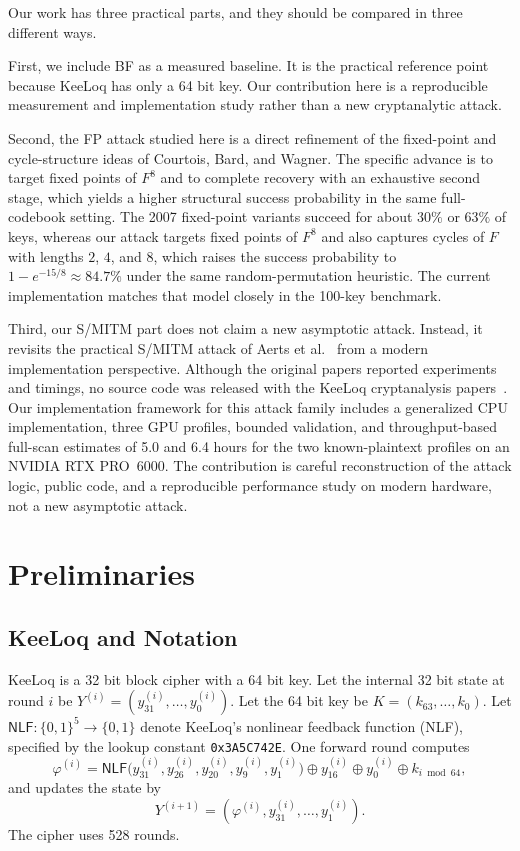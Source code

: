 \documentclass[version=preprint]{iacrcc}
\providecommand{\NLF}{\mathsf{NLF}}
\begin{document}
Our work has three practical parts, and they should be compared in three different ways.

First, we include BF as a measured baseline.
It is the practical reference point because KeeLoq has only a 64 bit key.
Our contribution here is a reproducible measurement and implementation study rather than a new cryptanalytic attack.

Second, the FP attack studied here is a direct refinement of the fixed-point and cycle-structure ideas of Courtois, Bard, and Wagner.
The specific advance is to target fixed points of $F^8$ and to complete recovery with an exhaustive second stage, which yields a higher structural success probability in the same full-codebook setting.
The 2007 fixed-point variants succeed for about $30\%$ or $63\%$ of keys, whereas our attack targets fixed points of $F^8$ and also captures cycles of $F$ with lengths $2$, $4$, and $8$, which raises the success probability to $1 - e^{-15/8} \approx 84.7\%$ under the same random-permutation heuristic.
The current implementation matches that model closely in the 100-key benchmark.

Third, our S/MITM part does not claim a new asymptotic attack.
Instead, it revisits the practical S/MITM attack of Aerts et al.~\cite{indesteege2008practical} from a modern implementation perspective.
Although the original papers reported experiments and timings, no source code was released with the KeeLoq cryptanalysis papers~\cite{bogdanov2007linear,courtois2007algebraic,indesteege2008practical}.
Our implementation framework for this attack family includes a generalized CPU implementation, three GPU profiles, bounded validation, and throughput-based full-scan estimates of 5.0 and 6.4 hours for the two known-plaintext profiles on an NVIDIA RTX PRO~6000.
The contribution is careful reconstruction of the attack logic, public code, and a reproducible performance study on modern hardware, not a new asymptotic attack.

\section{Preliminaries}\label{sec:preliminaries}

\subsection{KeeLoq and Notation}

KeeLoq is a 32 bit block cipher with a 64 bit key.
Let the internal 32 bit state at round $i$ be $Y^{(i)} = (y^{(i)}_{31}, \dots, y^{(i)}_{0})$.
Let the 64 bit key be $K = (k_{63}, \dots, k_0)$.
Let $\NLF:\{0,1\}^5\rightarrow\{0,1\}$ denote KeeLoq's nonlinear feedback function (NLF), specified by the lookup constant \texttt{0x3A5C742E}.
One forward round computes
\[
\varphi^{(i)} = \NLF\!\big(y^{(i)}_{31}, y^{(i)}_{26}, y^{(i)}_{20}, y^{(i)}_9, y^{(i)}_1\big)
\oplus y^{(i)}_{16} \oplus y^{(i)}_0 \oplus k_{i \bmod 64},
\]
and updates the state by
\[
Y^{(i+1)} = (\varphi^{(i)}, y^{(i)}_{31}, \dots, y^{(i)}_1).
\]
The cipher uses 528 rounds.
\end{document}
